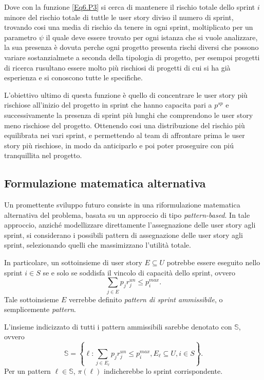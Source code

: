 \documentclass[12pt,a4paper,openright,twoside]{book}
\begin{document}
Dove con la funzione \eqref{Eq6.P3} si cerca di mantenere il rischio totale dello sprint $i$ minore del rischio totale di tuttle le user story diviso il numero di sprint, trovando cosi una media di rischio da tenere in ogni sprint, moltiplicato per un parametro $\psi$ il quale deve essere trovato per ogni istanza che si vuole analizzare, la sua presenza è dovuta perche ogni progetto presenta rischi diversi che possono variare sostanzialmete a seconda della tipologia di progetto, per esempoi progetti di ricerca rusultano essere molto più rischiosi di progetti di cui si ha già esperienza e si conoscono tutte le specifiche.

L'obiettivo ultimo di questa funzione è quello di concentrare le user story più rischiose all'inizio del progetto in sprint che hanno capacita pari a $p^{sp}$ e successivamente la presenza di sprint più lunghi che comprendono le user story meno rischiose del progetto. Ottenendo cosi una distribuzione del rischio più equilibrata nei vari sprint, e permettendo al team di affrontare prima le user story più rischiose, in modo da anticiparlo e poi poter proseguire con pi\'u tranquillita nel progetto.

\subsection{Formulazione matematica alternativa}

Un promettente sviluppo futuro consiste in una riformulazione matematica alternativa del problema, basata su un approccio di tipo {\em pattern-based}. In tale approccio, anziché modellizzare direttamente l'assegnazione delle user story agli sprint, si considerano i possibili pattern di assegnazione delle user story agli sprint, selezionando quelli che massimizzano l'utilità totale.

In particolare, un sottoinsieme di user story $E \subseteq U$ potrebbe essere eseguito nello sprint $i \in S$ se e solo se soddisfa il vincolo di capacità dello sprint, ovvero 
\[
\sum_{j \in E} p_j r_j^{un} \leq p_i^{max}.
\] 
Tale sottoinsieme $E$ verrebbe definito {\em pattern di sprint ammissibile}, o semplicemente {\em pattern}.

L'insieme indicizzato di tutti i pattern ammissibili sarebbe denotato con $\mathbb{S}$, ovvero
\[
\mathbb{S} = \left\{ \ell : \sum_{j \in E_{\ell}} p_j r_j^{un} \leq p_i^{max}, E_{\ell} \subseteq U, i \in S \right\}.
\]
Per un pattern $\ell \in \mathbb{S}$, $\pi(\ell)$ indicherebbe lo sprint corrispondente.
\end{document}
